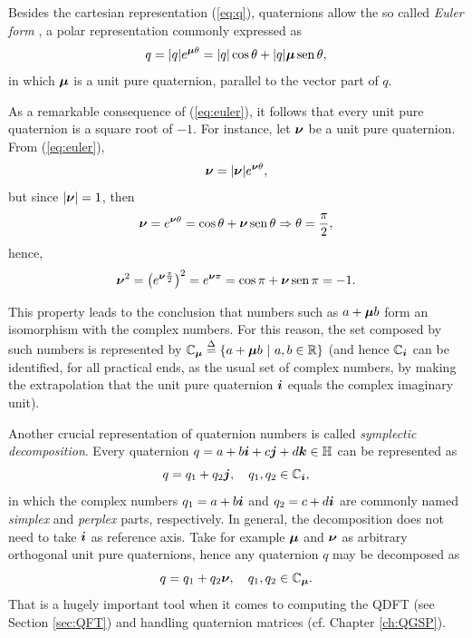 Besides the cartesian representation (\ref{eq:q}), quaternions allow the so called \emph{Euler form} \cite{ell2014quaternion}, a polar representation commonly expressed as
\begin{equation}
    \label{eq:euler}
    q = |q| e^{\boldsymbol{\mu} \theta} = |q|\cos \theta + |q|\boldsymbol{\mu} \mathrm{\, sen \,} \theta,
\end{equation}
in which $ \boldsymbol{\mu} $ is a unit pure quaternion, parallel to the vector part of $ q $.

As a remarkable consequence of (\ref{eq:euler}), it follows that every unit pure quaternion is a square root of $-1$. For instance, let $ \boldsymbol{\nu} $ be a unit pure quaternion. From (\ref{eq:euler}),
\begin{equation}
    \boldsymbol{\nu} = |\boldsymbol{\nu}| e^{\boldsymbol{\nu} \theta},
\end{equation}
but since $ |\boldsymbol{\nu}| = 1 $, then
\begin{equation}
    \boldsymbol{\nu} = e^{\boldsymbol{\nu} \theta}  = \cos \theta + \boldsymbol{\nu} \mathrm{\, sen \,} \theta \Rightarrow \theta = \frac{\pi}{2},
\end{equation}
hence,
\begin{equation}
    \boldsymbol{\nu}^2 = \left( e^{ \boldsymbol{\nu} \frac{\pi}{2}} \right)^2 = e^{\boldsymbol{\nu} \pi} = \cos \pi + \boldsymbol{\nu} \mathrm{\, sen \,} \pi = -1.
\end{equation}

This property leads to the conclusion that numbers such as $ a + \boldsymbol{\mu} b  $ form an isomorphism with the complex numbers. For this reason, the set composed by such numbers is represented by $ \mathbb{C}_{\boldsymbol{\mu}} \overset{\Delta}{=} \{ a + \boldsymbol{\mu} b \ |\  a, b \in \mathbb{R} \}$ (and hence $ \mathbb{C}_{\boldsymbol{i}} $ can be identified, for all practical ends, as the usual set of complex numbers, by making the extrapolation that the unit pure quaternion $\boldsymbol{i}$ equals the complex imaginary unit).

Another crucial representation of quaternion numbers is called \emph{symplectic decomposition}. Every quaternion $ q = a + b\boldsymbol{i} + c\boldsymbol{j} + d\boldsymbol{k} \in \mathbb{H} $ can be represented as
\begin{equation}
    q = q_1 + q_2 \boldsymbol{j}, \quad q_1, q_2 \in \mathbb{C}_{\boldsymbol{i}},
\end{equation}
in which the complex numbers $ q_1 = a + b\boldsymbol{i} $ and $ q_2 = c + d\boldsymbol{i} $ are commonly named \emph{simplex} and \emph{perplex} parts, respectively. In general, the decomposition does not need to take $\boldsymbol{i}$ as reference axis. Take for example $ \boldsymbol{\mu} $ and $ \boldsymbol{\nu} $ as arbitrary orthogonal unit pure quaternions, hence any quaternion $ q $ may be decomposed as
\begin{equation}
    \label{eq:decomposicao}
    q = q_1 + q_2 \boldsymbol{\nu}, \quad q_1, q_2 \in \mathbb{C}_{\boldsymbol{\mu}}.
\end{equation}
That is a hugely important tool when it comes to computing the QDFT (see Section \ref{sec:QFT}) and handling quaternion matrices (cf. Chapter \ref{ch:QGSP}).

